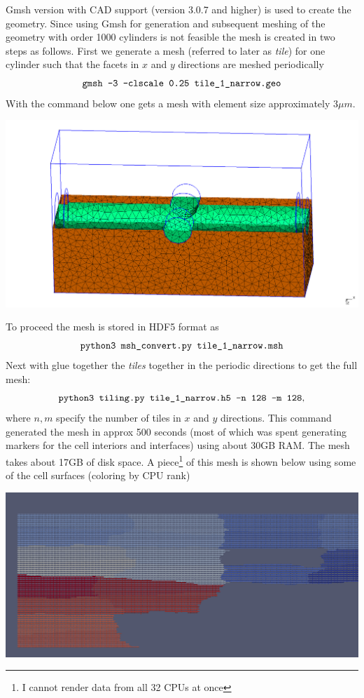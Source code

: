 \documentclass[11pt,a4paper]{article}
\begin{document}
Gmsh version with CAD support (version 3.0.7 and higher) is used to create
the geometry. Since using Gmsh for generation and subsequent meshing of the 
geometry with order 1000 cylinders is not feasible the mesh is created in two 
steps as follows. First we generate a mesh (referred to later as \emph{tile}) 
for one cylinder such that the facets in $x$ and $y$ directions are meshed periodically
\[
\texttt{gmsh -3 -clscale 0.25 tile\textunderscore 1\textunderscore narrow.geo}
\]
With the command below one gets a mesh with element size approximately 3$\mu m$.
\begin{center}
\includegraphics[width=\textwidth]{tile_1.png}
\end{center}
To proceed the mesh is stored in HDF5 format as
\[
\texttt{python3 msh\textunderscore convert.py tile\textunderscore 1\textunderscore narrow.msh}
\]
Next with glue together the \emph{tiles} together in the periodic directions to 
get the full mesh:
\[
\texttt{python3 tiling.py tile\textunderscore 1\textunderscore narrow.h5 -n 128 -m 128},
\]
where $n, m$ specify the number of tiles in $x$ and $y$ directions. This command 
generated the mesh in approx 500 seconds (most of which was spent generating markers for the 
cell interiors and interfaces) using about 30GB RAM. The mesh takes about 17GB of disk space.
A piece\footnote{I cannot render data from all 32 CPUs at once} of this mesh is shown below 
using some of the cell surfaces (coloring by CPU rank) 
\begin{center}
\includegraphics[width=\textwidth]{piece.png}
\end{center}
\end{document}
